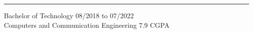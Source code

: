 {\par}\vspace{-8pt}
\noindent\rule{\linewidth}{0.4pt}

Bachelor of Technology \hfill 08/2018 to 07/2022 \\
Computers and Communication Engineering \hfill 7.9 CGPA \\
